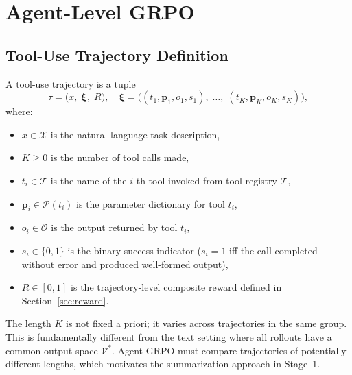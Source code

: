 \section{Agent-Level GRPO}

\label{sec:agentgrpo}

\subsection{Tool-Use Trajectory Definition}
\label{sec:trajectories}

\begin{definition}
\label{def:trajectory}
A tool-use trajectory is a tuple
\begin{equation}
    \tau = \bigl(x,\;\bm{\xi},\;R\bigr),
    \quad \bm{\xi} = \bigl((t_1, \bm{p}_1, o_1, s_1),\;\ldots,\;(t_K, \bm{p}_K, o_K, s_K)\bigr),
    \label{eq:trajectory}
\end{equation}
where:
\begin{itemize}[leftmargin=1.5em]
    \item $x \in \mathcal{X}$ is the natural-language task description,
    \item $K \geq 0$ is the number of tool calls made,
    \item $t_i \in \mathcal{T}$ is the name of the $i$-th tool invoked from
          tool registry $\mathcal{T}$,
    \item $\bm{p}_i \in \mathcal{P}(t_i)$ is the parameter dictionary for
          tool $t_i$,
    \item $o_i \in \mathcal{O}$ is the output returned by tool $t_i$,
    \item $s_i \in \{0, 1\}$ is the binary success indicator ($s_i = 1$ iff
          the call completed without error and produced well-formed output),
    \item $R \in [0, 1]$ is the trajectory-level composite reward defined in
          Section~\ref{sec:reward}.
\end{itemize}
\end{definition}

\begin{remark}
The length $K$ is not fixed a priori; it varies across trajectories in the
same group. This is fundamentally different from the text setting where all
rollouts have a common output space $\mathcal{V}^*$. Agent-GRPO must compare
trajectories of potentially different lengths, which motivates the
summarization approach in Stage~1.
\end{remark}

